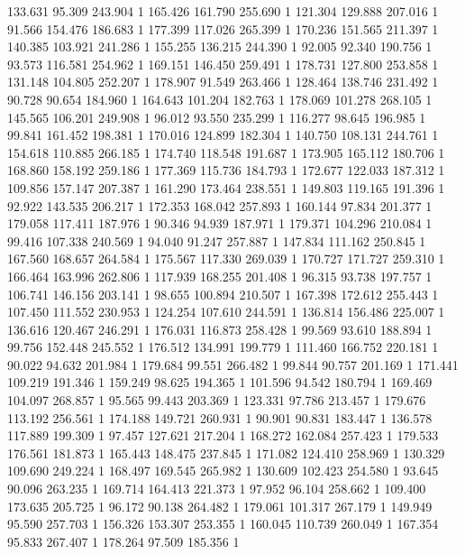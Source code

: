 	133.631	95.309	243.904	1
	165.426	161.790	255.690	1
	121.304	129.888	207.016	1
	91.566	154.476	186.683	1
	177.399	117.026	265.399	1
	170.236	151.565	211.397	1
	140.385	103.921	241.286	1
	155.255	136.215	244.390	1
	92.005	92.340	190.756	1
	93.573	116.581	254.962	1
	169.151	146.450	259.491	1
	178.731	127.800	253.858	1
	131.148	104.805	252.207	1
	178.907	91.549	263.466	1
	128.464	138.746	231.492	1
	90.728	90.654	184.960	1
	164.643	101.204	182.763	1
	178.069	101.278	268.105	1
	145.565	106.201	249.908	1
	96.012	93.550	235.299	1
	116.277	98.645	196.985	1
	99.841	161.452	198.381	1
	170.016	124.899	182.304	1
	140.750	108.131	244.761	1
	154.618	110.885	266.185	1
	174.740	118.548	191.687	1
	173.905	165.112	180.706	1
	168.860	158.192	259.186	1
	177.369	115.736	184.793	1
	172.677	122.033	187.312	1
	109.856	157.147	207.387	1
	161.290	173.464	238.551	1
	149.803	119.165	191.396	1
	92.922	143.535	206.217	1
	172.353	168.042	257.893	1
	160.144	97.834	201.377	1
	179.058	117.411	187.976	1
	90.346	94.939	187.971	1
	179.371	104.296	210.084	1
	99.416	107.338	240.569	1
	94.040	91.247	257.887	1
	147.834	111.162	250.845	1
	167.560	168.657	264.584	1
	175.567	117.330	269.039	1
	170.727	171.727	259.310	1
	166.464	163.996	262.806	1
	117.939	168.255	201.408	1
	96.315	93.738	197.757	1
	106.741	146.156	203.141	1
	98.655	100.894	210.507	1
	167.398	172.612	255.443	1
	107.450	111.552	230.953	1
	124.254	107.610	244.591	1
	136.814	156.486	225.007	1
	136.616	120.467	246.291	1
	176.031	116.873	258.428	1
	99.569	93.610	188.894	1
	99.756	152.448	245.552	1
	176.512	134.991	199.779	1
	111.460	166.752	220.181	1
	90.022	94.632	201.984	1
	179.684	99.551	266.482	1
	99.844	90.757	201.169	1
	171.441	109.219	191.346	1
	159.249	98.625	194.365	1
	101.596	94.542	180.794	1
	169.469	104.097	268.857	1
	95.565	99.443	203.369	1
	123.331	97.786	213.457	1
	179.676	113.192	256.561	1
	174.188	149.721	260.931	1
	90.901	90.831	183.447	1
	136.578	117.889	199.309	1
	97.457	127.621	217.204	1
	168.272	162.084	257.423	1
	179.533	176.561	181.873	1
	165.443	148.475	237.845	1
	171.082	124.410	258.969	1
	130.329	109.690	249.224	1
	168.497	169.545	265.982	1
	130.609	102.423	254.580	1
	93.645	90.096	263.235	1
	169.714	164.413	221.373	1
	97.952	96.104	258.662	1
	109.400	173.635	205.725	1
	96.172	90.138	264.482	1
	179.061	101.317	267.179	1
	149.949	95.590	257.703	1
	156.326	153.307	253.355	1
	160.045	110.739	260.049	1
	167.354	95.833	267.407	1
	178.264	97.509	185.356	1
